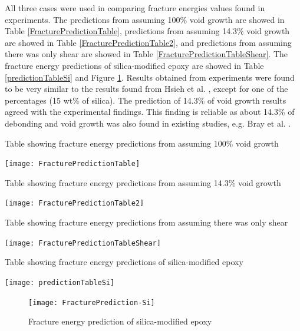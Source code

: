 \documentclass[numbers=noendperiod,chapterprefix=on]{icldt} %
\begin{document}
All three cases were used in comparing fracture energies values found in experiments. 
The predictions from assuming 100\% void growth are showed in Table \ref{FracturePredictionTable}, predictions from assuming 14.3\% void growth are showed in Table \ref{FracturePredictionTable2}, and predictions from assuming there was only shear are showed in Table \ref{FracturePredictionTableShear}. The fracture energy predictions of silica-modified epoxy are showed in Table \ref{predictionTableSi} and Figure \ref{FracturePrediction-Si}. Results obtained from experiments were found to be very similar to the results found from Hsieh et al. \cite{Hsieh2010a}, except for one of the percentages (15 wt\% of silica). The prediction of 14.3\% of void growth results agreed with the experimental findings. This finding is reliable as about 14.3\% of debonding and void growth was also found in existing studies, e.g. Bray et al. \cite{Masania2010}. 

\begin{table}[!htpb]
\centering
\caption{Table showing fracture energy predictions from assuming 100\% void growth} \label{FracturePredictionTable}
\texttt{[image: FracturePredictionTable]}
\end{table}
\FloatBarrier

\begin{table}[!htpb]
\centering
\caption{Table showing fracture energy predictions from assuming 14.3\% void growth} \label{FracturePredictionTable2}
\texttt{[image: FracturePredictionTable2]}
\end{table}
\FloatBarrier

\begin{table}[!htpb]
\centering
\caption{Table showing fracture energy predictions from assuming there was only shear} \label{FracturePredictionTableShear}
\texttt{[image: FracturePredictionTableShear]}
\end{table}
\FloatBarrier

\begin{table}[!htpb]
\centering
\caption{Table showing fracture energy predictions of silica-modified epoxy} \label{predictionTableSi}
\texttt{[image: predictionTableSi]}
\end{table}
\FloatBarrier

\begin{figure}[!htpb]
\centering
\texttt{[image: FracturePrediction-Si]}
\caption{Fracture energy prediction of silica-modified epoxy} \label{FracturePrediction-Si}
\end{figure}
\FloatBarrier
\end{document}
